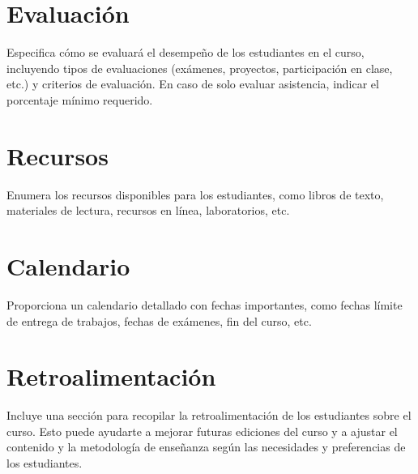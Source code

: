\documentclass[a4paper,11pt]{article}                 %
\begin{document}
  \section{Evaluación}
    Especifica cómo se evaluará el desempeño de los estudiantes en el curso, incluyendo tipos de evaluaciones (exámenes, proyectos, participación en clase, etc.) y criterios de evaluación. En caso de solo evaluar asistencia, indicar el porcentaje mínimo requerido.

  \section{Recursos}
    Enumera los recursos disponibles para los estudiantes, como libros de texto, materiales de lectura, recursos en línea, laboratorios, etc.

  \section{Calendario}
    Proporciona un calendario detallado con fechas importantes, como fechas límite de entrega de trabajos, fechas de exámenes, fin del curso, etc.

  \section{Retroalimentación}
    Incluye una sección para recopilar la retroalimentación de los estudiantes sobre el curso. Esto puede ayudarte a mejorar futuras ediciones del curso y a ajustar el contenido y la metodología de enseñanza según las necesidades y preferencias de los estudiantes.

\end{document}
